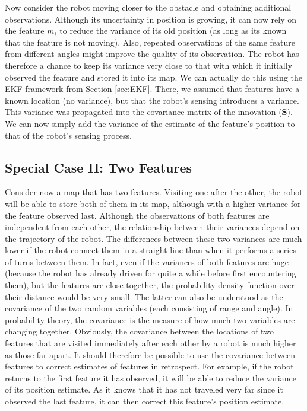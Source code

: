Now consider the robot moving closer to the obstacle and obtaining additional observations. Although its uncertainty in position is growing, it can now rely on the feature $m_i$ to reduce the variance of its old position (as long as its known that the feature is not moving). Also, repeated observations of the same feature from different angles might improve the quality of its observation. The robot has therefore a chance to keep its variance very close to that with which it initially observed the feature and stored it into its map. We can actually do this using the EKF framework from Section \ref{sec:EKF}. There, we assumed that features have a known location (no variance), but that the robot's sensing introduces a variance. This variance was propagated into the covariance matrix of the innovation ($ \boldsymbol{S}$). We can now simply add the variance of the estimate of the feature's position to that of the robot's sensing process.

\subsection{Special Case II: Two Features}
Consider now a map that has two features. Visiting one after the other, the robot will be able to store both of them in its map, although with a higher variance for the feature observed last. Although the observations of both features are independent from each other, the relationship between their variances depend on the trajectory of the robot. The differences between these two variances are much lower if the robot connect them in a straight line than when it performs a series of turns between them. In fact, even if the variances of both features are huge (because the robot has already driven for quite a while before first encountering them), but the features are close together, the probability density function over their distance would be very small. The latter can also be understood as the covariance of the two random variables (each consisting of range and angle). In probability theory, the covariance is the measure of how much two variables are changing together. Obviously, the covariance between the locations of two features that are visited immediately after each other by a robot is much higher as those far apart. It should therefore be possible to use the covariance between features to correct estimates of features in retrospect. For example, if the robot returns to the first feature it has observed, it will be able to reduce the variance of its position estimate. As it knows that it has not traveled very far since it observed the last feature, it can then correct this feature's position estimate.

